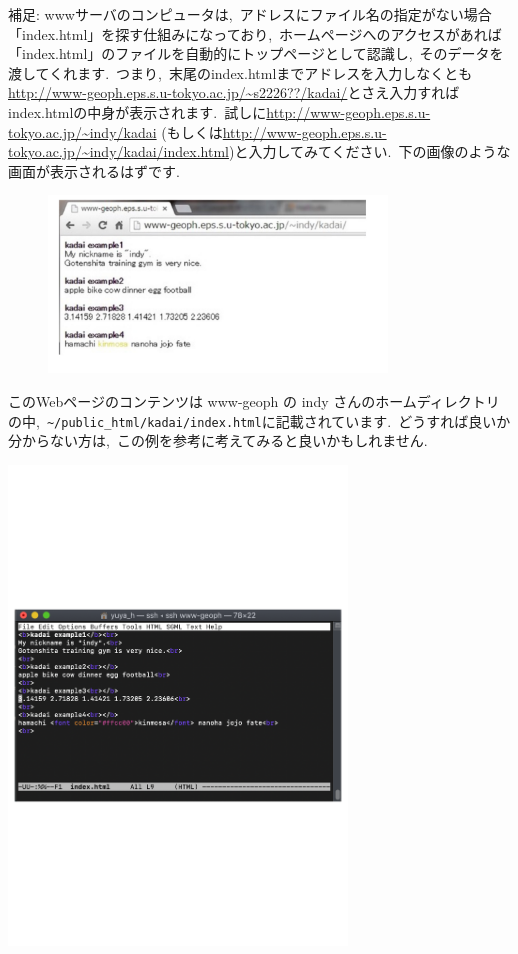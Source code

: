 \documentclass{jarticle}
\begin{document}
補足: wwwサーバのコンピュータは,\ アドレスにファイル名の指定がない場合「index.html」を探す仕組みになっており,\ 
ホームページへのアクセスがあれば「index.html」のファイルを自動的にトップページとして認識し,\ そのデータを渡してくれます.\ 
つまり,\ 末尾のindex.htmlまでアドレスを入力しなくとも\url{http://www-geoph.eps.s.u-tokyo.ac.jp/~s2226??/kadai/}とさえ入力すればindex.htmlの中身が表示されます.\  
試しに\url{http://www-geoph.eps.s.u-tokyo.ac.jp/~indy/kadai}
 (もしくは\url{http://www-geoph.eps.s.u-tokyo.ac.jp/~indy/kadai/index.html})と入力してみてください.\ 
 下の画像のような画面が表示されるはずです.\ 
\begin{figure}[htbp]
 \begin{center}
  \includegraphics[width=90mm,pagebox=cropbox,clip]{fig/2.pdf}
 \end{center}
 \label{fig:one}
\end{figure}

このWebページのコンテンツは www-geoph の indy さんのホームディレクトリの中,\ \verb|~/public_html/kadai/index.html|に記載されています.\ どうすれば良いか分からない方は,\ この例を参考に考えてみると良いかもしれません.\ 
\begin{center}
 \includegraphics[width=90mm,pagebox=cropbox,clip]{fig/indy.pdf}
\end{center}
\end{document}
